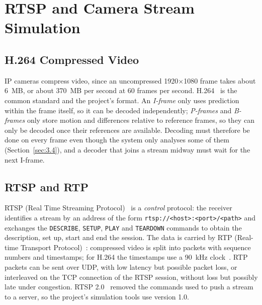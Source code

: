\section{RTSP and Camera Stream Simulation}
\label{sec:3.7}

\subsection{H.264 Compressed Video}
\label{sec:3.7.1}

IP cameras compress video, since an uncompressed 1920$\times$1080 frame takes about 6~MB, or about 370~MB per second at 60 frames per second. H.264~\cite{wiegand2003h264} is the common standard and the project's format. An \emph{I-frame} only uses prediction within the frame itself, so it can be decoded independently; \emph{P-frames} and \emph{B-frames} only store motion and differences relative to reference frames, so they can only be decoded once their references are available. Decoding must therefore be done on every frame even though the system only analyses some of them (Section~\ref{sec:3.4}), and a decoder that joins a stream midway must wait for the next I-frame.

\subsection{RTSP and RTP}
\label{sec:3.7.2}

RTSP (Real Time Streaming Protocol)~\cite{rfc2326} is a \emph{control} protocol: the receiver identifies a stream by an address of the form \texttt{rtsp://<host>:<port>/<path>} and exchanges the \texttt{DESCRIBE}, \texttt{SETUP}, \texttt{PLAY} and \texttt{TEARDOWN} commands to obtain the description, set up, start and end the session. The data is carried by RTP (Real-time Transport Protocol)~\cite{rfc3550}: compressed video is split into packets with sequence numbers and timestamps; for H.264 the timestamps use a 90~kHz clock~\cite{rfc6184}. RTP packets can be sent over UDP, with low latency but possible packet loss, or interleaved on the TCP connection of the RTSP session, without loss but possibly late under congestion. RTSP 2.0~\cite{rfc7826} removed the commands used to push a stream to a server, so the project's simulation tools use version 1.0.


